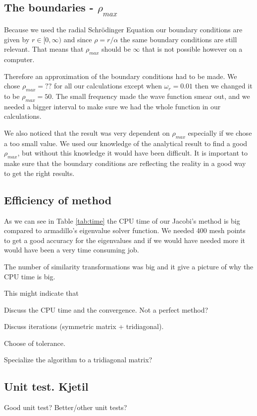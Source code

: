 \subsection{The boundaries - $\rho_{max}$}

Because we used the radial Schrödinger Equation our boundary conditions are given by $r\in[0,\infty)$ and since $\rho = r/\alpha$ the same boundary conditions are still relevant. That means that $\rho_{max}$ should be $\infty$ that is not possible however on a computer.

Therefore an approximation of the boundary conditions had to be made. We chose $\rho_{max} = ?? $ for all our calculations except when $\omega_r = 0.01$ then we changed it to be $\rho_{max} = 50$. The small frequency made the wave function smear out, and we needed a bigger interval to make sure we had the whole function in our calculations. 

We also noticed that the result was very dependent on $\rho_{max}$ especially if we chose a too small value. We used our knowledge of the analytical result to find a good $\rho_{max}$, but without this knowledge it would have been difficult. It is important to make sure that the boundary conditions are reflecting the reality in a good way to get the right results. 

\subsection{Efficiency of method}

As we can see in Table \ref{tab:time} the CPU time of our Jacobi's method is big compared to armadillo's eigenvalue solver function. We needed 400 mesh points to get a good accuracy for the eigenvalues and if we would have needed more it would have been a very time consuming job.

The number of similarity transformations was big and it give a picture of why the CPU time is big. 

This might indicate that 

Discuss the CPU time and the convergence. Not a perfect method?

Discuss iterations (symmetric matrix + tridiagonal).

Choose of tolerance.

Specialize the algorithm to a tridiagonal matrix?

\subsection{Unit test. Kjetil}

Good unit test? Better/other unit tests?


